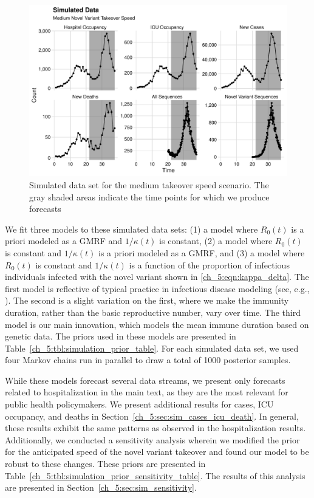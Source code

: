 \begin{figure}
    \centering
    \includegraphics[width=1.0\columnwidth]{simulated_binned_data_medium_plot}
    \caption[Simulated data set for the medium takeover speed scenario.]{Simulated data set for the medium takeover speed scenario.
    The gray shaded areas indicate the time points for which we produce forecasts}
    \label{ch_5:fig:simulated_binned_data_medium_plot}
\end{figure}

We fit three models to these simulated data sets: (1) a model where \( R_0(t) \) is a priori modeled as a GMRF and \( 1 / \kappa(t) \) is constant, (2) a model where \( R_0(t) \) is constant and \( 1 / \kappa(t) \) is a priori modeled as a GMRF, and (3) a model where \( R_0(t) \) is constant and \( 1 / \kappa(t) \) is a function of the proportion of infectious individuals infected with the novel variant shown in \eqref{ch_5:eqn:kappa_delta}.
The first model is reflective of typical practice in infectious disease modeling (see, e.g., \citep{Gibson2020real, ODea2021semi}).
The second is a slight variation on the first, where we make the immunity duration, rather than the basic reproductive number, vary over time.
The third model is our main innovation, which models the mean immune duration based on genetic data.
The priors used in these models are presented in Table~\ref{ch_5:tbl:simulation_prior_table}.
For each simulated data set, we used four Markov chains run in parallel to draw a total of 1000 posterior samples.

While these models forecast several data streams, we present only forecasts related to hospitalization in the main text, as they are the most relevant for public health policymakers.
We present additional results for cases, ICU occupancy, and deaths in Section~\ref{ch_5:sec:sim_cases_icu_death}.
In general, these results exhibit the same patterns as observed in the hospitalization results.
Additionally, we conducted a sensitivity analysis wherein we modified the prior for the anticipated speed of the novel variant takeover and found our model to be robust to these changes.
These priors are presented in Table~\ref{ch_5:tbl:simulation_prior_sensitivity_table}.
The results of this analysis are presented in Section~\ref{ch_5:sec:sim_sensitivity}.

